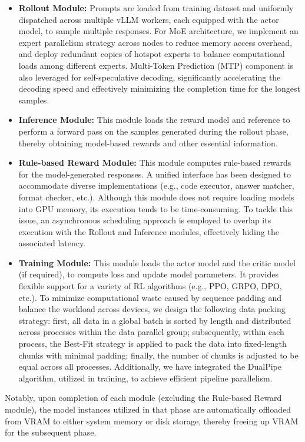 \begin{itemize}
    \item \textbf{Rollout Module:} Prompts are loaded from training dataset and uniformly dispatched across multiple vLLM \citep{vllm} workers, each equipped with the actor model, to sample multiple responses. For \dsviii{} MoE architecture, we implement an expert parallelism strategy across nodes to reduce memory access overhead, and deploy redundant copies of hotspot experts to balance computational loads among different experts. Multi-Token Prediction (MTP) component is also leveraged for self-speculative decoding, significantly accelerating the decoding speed and effectively minimizing the completion time for the longest samples.
    \item \textbf{Inference Module:} This module loads the reward model and reference to perform a forward pass on the samples generated during the rollout phase, thereby obtaining model-based rewards and other essential information.
    \item \textbf{Rule-based Reward Module:} This module computes rule-based rewards for the model-generated responses. A unified interface has been designed to accommodate diverse implementations (e.g., code executor, answer matcher, format checker, etc.). Although this module does not require loading models into GPU memory, its execution tends to be time-consuming. To tackle this issue, an asynchronous scheduling approach is employed to overlap its execution with the Rollout and Inference modules, effectively hiding the associated latency.
    \item \textbf{Training Module:} This module loads the actor model and the critic model (if required), to compute loss and update model parameters. It provides flexible support for a variety of RL algorithms (e.g., PPO, GRPO, DPO, etc.). To minimize computational waste caused by sequence padding and balance the workload across devices, we design the following data packing strategy: first, all data in a global batch is sorted by length and distributed across processes within the data parallel group; subsequently, within each process, the Best-Fit strategy is applied to pack the data into fixed-length chunks with minimal padding; finally, the number of chunks is adjusted to be equal across all processes. Additionally, we have integrated the DualPipe algorithm, utilized in \dsviii{} training, to achieve efficient pipeline parallelism.
\end{itemize}

Notably, upon completion of each module (excluding the Rule-based Reward module), the model instances utilized in that phase are automatically offloaded from VRAM to either system memory or disk storage, thereby freeing up VRAM for the subsequent phase.

